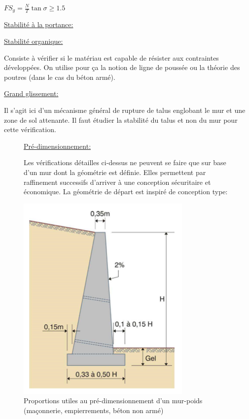         \begin{center}
            $FS_g = \frac{N}{T} \tan \sigma   \ge 1.5$
        \end{center} 
        
        \underline{Stabilité à la portance:} 
        
        \underline{Stabilité organique:} 
        
        Consiste à vérifier si le matériau est capable de résister aux contraintes développées. On utilise pour ça la notion de ligne de poussée ou la théorie des poutres (dans le cas du béton armé). 
        
        \underline{Grand glissement:} 
        
        Il s'agit ici d'un mécanisme général de rupture de talus englobant le mur et une zone de sol attenante. Il faut étudier la stabilité du talus et non du mur pour cette vérification. 
        
        \begin{figure}[h!]
        \underline{Pré-dimensionnement:} 
        
        Les vérifications détailles ci-dessus ne peuvent se faire que sur base d'un mur dont la géométrie est définie. Elles permettent par raffinement successifs d'arriver à une conception sécuritaire et économique. La géométrie de départ est inspiré de conception type: 
        
            \centering
            \includegraphics{Holeyman/images/H51.PNG}
            \caption{ Proportions utiles au pré-dimensionnement d’un mur-poids (maçonnerie, empierrements, béton non armé) }
        \end{figure}
        
        
